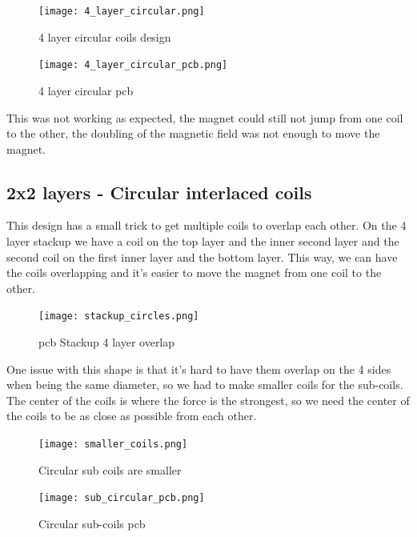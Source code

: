 \begin{figure}[H]
	\centering
	\texttt{[image: 4\_layer\_circular.png]}
	\caption[4 layer circular coils design]{4 layer circular coils design}
	\label{fig:4_layer_circular}
\end{figure}

\begin{figure}[H]
	\centering
	\texttt{[image: 4\_layer\_circular\_pcb.png]}
	\caption[4 layer circular \gls{pcb}]{4 layer circular \gls{pcb}}
	\label{fig:4_layer_circular_pcb}
\end{figure}



This was not working as expected, the magnet could still not jump from one coil to the other, the doubling of the magnetic field was not enough to move the magnet.

\newpage

\subsection{2x2 layers - Circular interlaced coils}

This design has a small trick to get multiple coils to overlap each other. On the 4 layer stackup we have a coil on the top layer and the inner second layer and the second coil on the first inner layer and the bottom layer. This way, we can have the coils overlapping and it's easier to move the magnet from one coil to the other.


\begin{figure}[H]
	\centering
	\texttt{[image: stackup\_circles.png]}
	\caption[\gls{pcb} Stackup 4 layer overlap]{\gls{pcb} Stackup 4 layer overlap}
	\label{fig:stackup_circles}
\end{figure}

One issue with this shape is that it's hard to have them overlap on the 4 sides when being the same diameter, so we had to make smaller coils for the sub-coils. The center of the coils is where the force is the strongest, so we need the center of the coils to be as close as possible from each other.

\begin{figure}[H]
	\centering
	\texttt{[image: smaller\_coils.png]}
	\caption[Circular sub coils are smaller]{Circular sub coils are smaller}
	\label{fig:smaller_coils}
\end{figure}

\begin{figure}[H]
	\centering
	\texttt{[image: sub\_circular\_pcb.png]}
	\caption[Circular sub-coils \gls{pcb}]{Circular sub-coils \gls{pcb}}
	\label{fig:sub_circular_pcb}
\end{figure}

